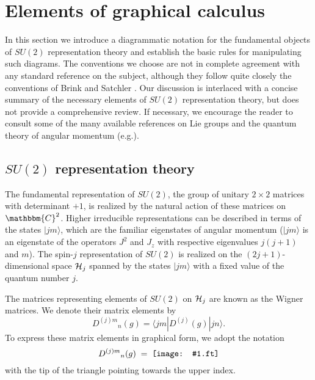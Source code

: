 \documentclass[graybox, secnum]{svmult}
\makeatletter
\newcommand{\ft}{pdf}        %
\newcommand{\makeSymbol}[1]{\mathord{\vcenter{\hbox{#1}}}}
\newcommand{\Symbol}[1]{\makeSymbol{\texttt{[image: \#1.\\ft]}}}
\newcommand{\bra}[1]{\langle #1 |}
\newcommand{\ket}[1]{|#1\rangle}
\newcommand{\eg}{e.g.\@\xspace}
\newcommand{\C}{\mathbbm{C}}
\newcommand{\idx}[1]{#1}
\newcommand{\DD}[4]{{D^{(#1)#2}}_{#3}(#4)}
\makeatother
\begin{document}
\section{Elements of graphical calculus}
\label{sec:elements}

In this section we introduce a diagrammatic notation for the fundamental objects of $SU(2)$ representation theory and establish the basic rules for manipulating such diagrams. The conventions we choose are not in complete agreement with any standard reference on the subject, although they follow quite closely the conventions of Brink and Satchler \cite{brink1968angular}. Our discussion is interlaced with a concise summary of the necessary elements of $SU(2)$ representation theory, but does not provide a comprehensive review. If necessary, we encourage the reader to consult some of the many available references on Lie groups and the quantum theory of angular momentum (\eg \cite{brink1968angular, Edmonds, Fecko, Wigner-bk}).

\subsection{$SU(2)$ representation theory}

The fundamental representation of $SU(2)$, the group of unitary $2\times 2$ matrices with determinant $+1$, is realized by the natural action of these matrices on $\C^2$. Higher irreducible representations can be described in terms of the states $\ket{jm}$, which are the familiar eigenstates of angular momentum ($\ket{jm}$ is an eigenstate of the operators $J^2$ and $J_z$ with respective eigenvalues $j(j+1)$ and $m$). The spin-$j$ representation of $SU(2)$ is realized on the $(2j+1)$-dimensional space ${\cal H}_j$ spanned by the states $\ket{jm}$ with a fixed value of the quantum number $j$. 

The matrices representing elements of $SU(2)$ on ${\cal H}_j$ are known as the \idx{Wigner matrices}. We denote their matrix elements by
\begin{equation}
	\DD{j}{m}{n}{g} = \bra{jm}D^{(j)}(g)\ket{jn}.
	\label{}
\end{equation}
To express these matrix elements in graphical form, we adopt the notation
\begin{equation}
	\DD{j}{m}{n}{g} \; = \; \Symbol{Dmn}\vspace{-12pt}
	\label{g:D}
\end{equation}
with the tip of the triangle pointing towards the upper index.
\end{document}
